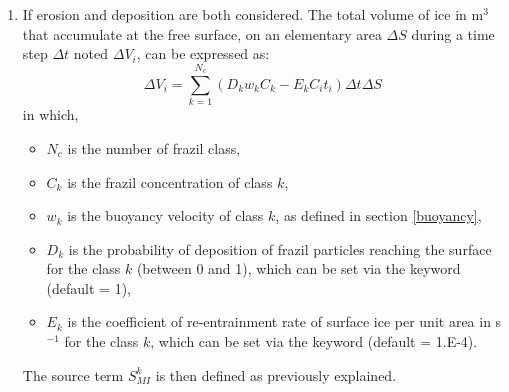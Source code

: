 \begin{enumerate}
\item If  erosion and deposition are both considered.
The total volume of ice in m$^3$ that accumulate at the free surface, on an elementary area $\Delta S$ during a time step $\Delta t$ noted $\Delta V_i$, can be expressed as:
\begin{equation}
\Delta V_i = \sum_{k=1}^{N_c} \left( D_k w_k C_k - E_k C_i t_i \right) \Delta t \Delta S 
\end{equation}
in which,
\begin{itemize}
  \item $N_c$ is the number of frazil class,
  \item $C_k$ is the frazil concentration of class $k$,
  \item $w_k$ is the buoyancy velocity of class $k$, as defined in section \ref{buoyancy},
  \item $D_k$ is the probability of deposition of frazil particles reaching the surface for the class $k$ (between 0 and 1), which can be set via the keyword  (default = 1),
  \item $E_k$ is the coefficient of re-entrainment rate of surface ice per unit area in s$^{-1}$ for the class $k$, which can be set via the keyword  (default = 1.E-4).
\end{itemize}
The source term $S_{MI}^k$ is then defined as previously explained. 

\end{enumerate}



